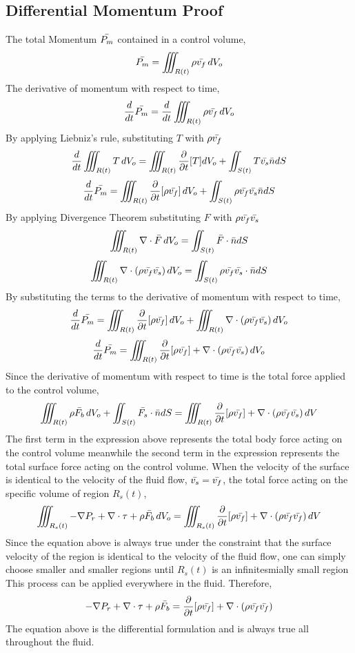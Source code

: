 \documentclass[a4paper, 12pt]{report}
\begin{document}
\begin{center}
\subsection{Differential Momentum Proof}
\begin{comment}
\end{comment}
The total Momentum $\bar{P_m}$ contained in a control volume,
$$\bar{P_m} = \iiint_{R(t)}\rho \bar{v_f} \,dV_o$$
The derivative of momentum with respect to time,
$$\frac{d}{dt}\bar{P_m} = \frac{d}{dt} \iiint_{R(t)}\rho \bar{v_f} \,dV_o$$
By applying Liebniz's rule, substituting $T$ with $\rho \bar{v_f}$
$$\frac{d}{dt}\iiint_{R(t)}T\,dV_o = \iiint_{R(t)}\frac{\partial}{\partial t}[T]dV_o + \iint_{S(t)}T\bar{v_s}\bar{n}dS$$
$$\frac{d}{dt}\bar{P_m} = \iiint_{R(t)}\frac{\partial}{\partial t}[\rho \bar{v_f}]\,dV_o + \iint_{S(t)}\rho \bar{v_f}\bar{v_s}\bar{n}dS$$
By applying Divergence Theorem substituting $F$ with $\rho \bar{v_f}\bar{v_s}$
$$\iiint_{R(t)}  \nabla \cdot \bar{F} \,dV_o = \iint_{S(t)}\bar{F}\cdot \bar{n}dS$$
$$\iiint_{R(t)}  \nabla \cdot (\rho \bar{v_f}\bar{v_s}) \,dV_o = \iint_{S(t)} \rho \bar{v_f}\bar{v_s} \cdot \bar{n}dS$$
By substituting the terms to the derivative of momentum with respect to time,
$$\frac{d}{dt}\bar{P_m} = \iiint_{R(t)}\frac{\partial}{\partial t}[\rho \bar{v_f}]\,dV_o + \iiint_{R(t)}  \nabla \cdot (\rho \bar{v_f}\bar{v_s}) \,dV_o$$
$$\frac{d}{dt}\bar{P_m} = \iiint_{R(t)}\frac{\partial}{\partial t}[\rho \bar{v_f}] + \nabla \cdot (\rho \bar{v_f}\bar{v_s}) \,dV_o$$
Since the derivative of momentum with respect to time is the total force applied to the control volume,
$$\iiint_{R(t)}\rho \bar{F_b} \,dV_o + \iint_{S(t)} \bar{F_s} \cdot \bar{n}dS = \iiint_{R(t)}\frac{\partial}{\partial t}[\rho \bar{v_f}] + \nabla \cdot (\rho \bar{v_f}\bar{v_s}) \,dV$$
The first term in the expression above represents the total body force acting on the control volume meanwhile the second term in the expression represents the total surface force acting on the control volume. When the velocity of the surface is identical to the velocity of the fluid flow, $\bar{v_s} = \bar{v_f}$, the total force acting on the specific volume of region $R_s(t)$,
$$\iiint_{R_s(t)} -\nabla P_r + \nabla \cdot \tau + \rho \bar{F_b} \,dV_o = \iiint_{R_s(t)}\frac{\partial}{\partial t}[\rho \bar{v_f}] + \nabla \cdot (\rho \bar{v_f}\bar{v_f}) \,dV$$
Since the equation above is always true under the constraint that the surface velocity of the region is identical to the velocity of the fluid flow, one can simply choose smaller and smaller regions until $R_s(t)$ is an infinitesmially small region This process can be applied everywhere in the fluid. Therefore,
$$ -\nabla P_r + \nabla \cdot \tau + \rho \bar{F_b} = \frac{\partial}{\partial t}[\rho \bar{v_f}] + \nabla \cdot (\rho \bar{v_f}\bar{v_f})$$
The equation above is the differential formulation and is always true all throughout the fluid. 

\end{center}
\end{document}
